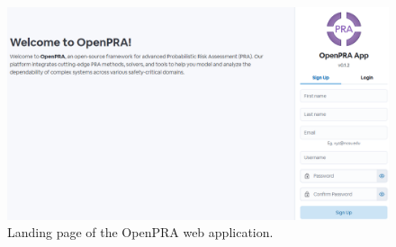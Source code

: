 \begin{figure}
  \centering
  \includegraphics[width=1.0\textwidth]{4_proposed_solution/web_app/figures/landing_page.png}
  \caption{Landing page of the OpenPRA web application.}
  \label{fig:landing_page}
\end{figure}